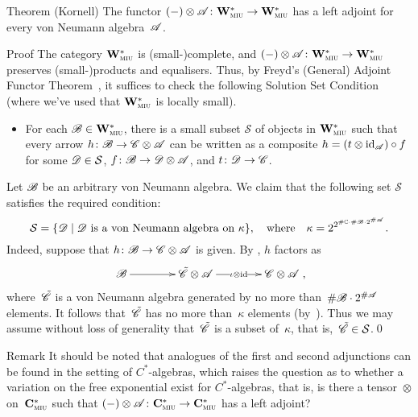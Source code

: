 \documentclass[a]{subfiles}
\begin{document}
\begin{parsec}
\begin{point}{Theorem (Kornell)}%
The functor $(-)\otimes\mathscr{A}\colon\mathbf{W}^*_{\text{\textsc{miu}}}\to\mathbf{W}^*_{\text{\textsc{miu}}}$
has a left adjoint
for every von Neumann algebra~$\mathscr{A}$.
\begin{point}{Proof}%
	The category $\mathbf{W}^*_{\text{\textsc{miu}}}$ is (small-)complete,
and
$(-)\otimes\mathscr{A}\colon\mathbf{W}^*_{\text{\textsc{miu}}}\to\mathbf{W}^*_{\text{\textsc{miu}}}$
preserves (small-)products and equalisers.
Thus,
by Freyd's (General)
Adjoint Functor Theorem~\cite[Thm.~V.6.2]{maclane1978},
it suffices to check the following Solution Set Condition
(where we've used that $\mathbf{W}^*_{\text{\textsc{miu}}}$
is locally small).
\begin{itemize}
\item
	For each $\mathscr{B}\in\mathbf{W}^*_{\text{\textsc{miu}}}$, there is a small subset $\mathcal{S}$ of objects in $\mathbf{W}^*_{\text{\textsc{miu}}}$
such that every arrow $h\colon \mathscr{B}\to\mathscr{C}\otimes\mathscr{A}$
can be written as a composite $h=(t\otimes\operatorname{id}_{\mathscr{A}})\circ f$ for some $\mathscr{D}\in \mathcal{S}$,
$f\colon\mathscr{B}\to\mathscr{D}\otimes \mathscr{A}$, and $t\colon \mathscr{D}\to\mathscr{C}$.
\end{itemize}
Let $\mathscr{B}$ be an arbitrary von Neumann algebra.
We claim that the following set $\mathcal{S}$ satisfies the required condition:
\[
	\mathcal{S}=
\{\mathscr{D}\mid
\text{$\mathscr{D}$ is a von Neumann algebra on~$\kappa$}\},
\quad\text{where}\quad\kappa=2^{2^{\#\mathbb{C}\cdot\#\mathscr{B}\cdot2^{\#\mathscr{A}}}}.
\]
Indeed,
suppose that $h\colon \mathscr{B}\to\mathscr{C}\otimes\mathscr{A}$ is given.
By ,
$h$ factors
as
\begin{equation*}
	\xymatrix@C=4em{\scrB\ar[r] & \tilde\scrC\otimes 
\scrA\ar[r]|-{\iota\otimes \id} & \scrC\otimes\scrA },
\end{equation*}
where~$\tilde{\mathscr{C}}$
is a von Neumann algebra
generated by no more than~$\#\mathscr{B}\cdot2^{\#\mathscr{A}}$
elements.
It follows that~$\tilde{\mathscr{C}}$ has no
more than~$\kappa$ elements (by~).
Thus we may assume without loss of generality
that~$\tilde{\mathscr{C}}$
is a subset of~$\kappa$,
that is,~$\tilde{\mathscr{C}}\in\mathcal{S}$.\qed
\end{point}
\end{point}
\begin{point}{Remark}%
It should be noted that analogues
of the first and second adjunctions
can be found in the setting of $C^*$-algebras,
which raises the question as to whether
a variation on the free exponential exist for $C^*$-algebras,
that is, is there a tensor~$\otimes$ on~$\mathbf{C}^*_{\text{\textsc{miu}}}$
such that $(-)\otimes \mathscr{A}\colon
\mathbf{C}^*_{\text{\textsc{miu}}}\to\mathbf{C}^*_{\text{\textsc{miu}}}$
has a left adjoint?


\end{point}
\end{parsec}
\end{document}
